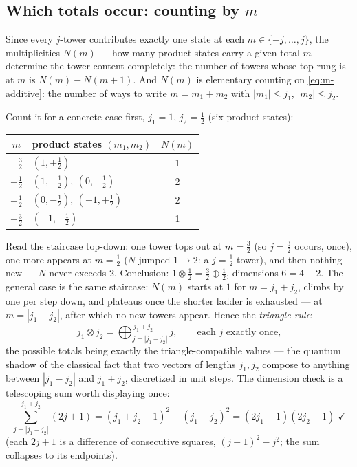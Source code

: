 \documentclass[11pt]{article}
\theoremstyle{plain}
\theoremstyle{definition}
\theoremstyle{remark}
\begin{document}
\subsection{Which totals occur: counting by $m$}
\label{sec:m-counting}

Since every $j$-tower contributes exactly one state at each $m \in
\{-j, \dots, j\}$, the multiplicities $N(m)$ --- how many product
states carry a given total $m$ --- determine the tower content
completely: the number of towers whose top rung is at $m$ is
$N(m) - N(m+1)$. And $N(m)$ is elementary counting on
\eqref{eq:m-additive}: the number of ways to write
$m = m_1 + m_2$ with $|m_1| \le j_1$, $|m_2| \le j_2$.

Count it for a concrete case first, $j_1 = 1$, $j_2 = \tfrac12$
(six product states):
\begin{center}
\begin{tabular}{c|l|c}
\toprule
$m$ & product states $(m_1, m_2)$ & $N(m)$ \\
\midrule
$+\tfrac32$ & $(1, +\tfrac12)$ & 1 \\
$+\tfrac12$ & $(1, -\tfrac12),\ (0, +\tfrac12)$ & 2 \\
$-\tfrac12$ & $(0, -\tfrac12),\ (-1, +\tfrac12)$ & 2 \\
$-\tfrac32$ & $(-1, -\tfrac12)$ & 1 \\
\bottomrule
\end{tabular}
\end{center}
Read the staircase top-down: one tower tops out at
$m = \tfrac32$ (so $j = \tfrac32$ occurs, once), one more appears at
$m = \tfrac12$ ($N$ jumped $1 \to 2$: a $j = \tfrac12$ tower), and
then nothing new --- $N$ never exceeds 2. Conclusion:
$1 \otimes \tfrac12 = \tfrac32 \oplus \tfrac12$, dimensions
$6 = 4 + 2$. The general case is the same staircase: $N(m)$ starts
at $1$ for $m = j_1 + j_2$, climbs by one per step down, and
plateaus once the shorter ladder is exhausted --- at
$m = |j_1 - j_2|$, after which no new towers appear. Hence the
\emph{triangle rule}:
\begin{equation}
  \boxed{\;
  j_1 \otimes j_2
  = \bigoplus_{j = |j_1 - j_2|}^{\,j_1 + j_2} j,
  \qquad
  \text{each } j \text{ exactly once,}
  \;}
  \label{eq:triangle-rule}
\end{equation}
the possible totals being exactly the triangle-compatible values
--- the quantum shadow of the classical fact that two vectors of
lengths $j_1, j_2$ compose to anything between $|j_1 - j_2|$ and
$j_1 + j_2$, discretized in unit steps. The dimension check is a
telescoping sum worth displaying once:
\begin{equation}
  \sum_{j = |j_1 - j_2|}^{j_1 + j_2} (2j + 1)
  = (j_1 + j_2 + 1)^2 - (j_1 - j_2)^2
  = (2j_1 + 1)(2j_2 + 1)
  \;\checkmark
\end{equation}
(each $2j + 1$ is a difference of consecutive squares,
$(j+1)^2 - j^2$; the sum collapses to its endpoints).
\end{document}
